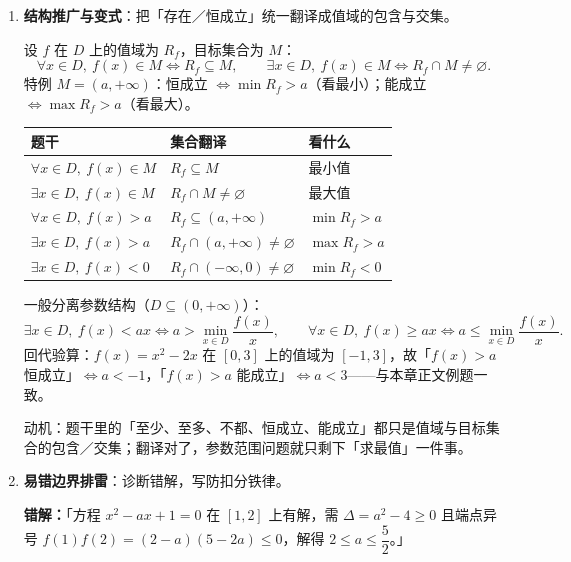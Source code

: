 \begin{tcolorbox}
\begin{enumerate}[label=(\arabic*), itemsep=4pt]
\textbf{对读结论}：通法胜在「步步可得分」，但要分三段；分离参数／补集胜在「一行出答案」。考场上先用高观点预判答案，再用通法把步骤写满。

\item \textbf{结构推广与变式}：把「存在／恒成立」统一翻译成值域的包含与交集。

\begin{advancedonly}
设 $f$ 在 $D$ 上的值域为 $R_f$，目标集合为 $M$：
\[
\forall x\in D,\ f(x)\in M\iff R_f\subseteq M,\qquad
\exists x\in D,\ f(x)\in M\iff R_f\cap M\neq\varnothing .
\]
特例 $M=(a,+\infty)$：恒成立 $\iff\min R_f>a$（看最小）；能成立 $\iff\max R_f>a$（看最大）。

\begin{center}\small
\begin{tabular}{p{3.6cm}p{5.4cm}p{3.2cm}}
\hline
题干 & 集合翻译 & 看什么 \\
\hline
$\forall x\in D,\ f(x)\in M$ & $R_f\subseteq M$ & 最小值 \\
$\exists x\in D,\ f(x)\in M$ & $R_f\cap M\neq\varnothing$ & 最大值 \\
$\forall x\in D,\ f(x)>a$ & $R_f\subseteq(a,+\infty)$ & $\min R_f>a$ \\
$\exists x\in D,\ f(x)>a$ & $R_f\cap(a,+\infty)\neq\varnothing$ & $\max R_f>a$ \\
$\exists x\in D,\ f(x)<0$ & $R_f\cap(-\infty,0)\neq\varnothing$ & $\min R_f<0$ \\
\hline
\end{tabular}
\end{center}

一般分离参数结构（$D\subseteq(0,+\infty)$）：
\[
\exists x\in D,\ f(x)<ax\iff a>\min_{x\in D}\frac{f(x)}x,\qquad
\forall x\in D,\ f(x)\ge ax\iff a\le\min_{x\in D}\frac{f(x)}x .
\]
回代验算：$f(x)=x^2-2x$ 在 $[0,3]$ 上的值域为 $[-1,3]$，故「$f(x)>a$ 恒成立」$\iff a<-1$，「$f(x)>a$ 能成立」$\iff a<3$——与本章正文例题一致。

动机：题干里的「至少、至多、不都、恒成立、能成立」都只是值域与目标集合的包含／交集；翻译对了，参数范围问题就只剩下「求最值」一件事。
\end{advancedonly}

\item \textbf{易错边界排雷}：诊断错解，写防扣分铁律。

{\bfseries\color{red!70!black}错解：}「方程 $x^2-ax+1=0$ 在 $[1,2]$ 上有解，需 $\Delta=a^2-4\ge0$ 且端点异号 $f(1)f(2)=(2-a)(5-2a)\le0$，解得 $2\le a\le\dfrac52$。」


\end{enumerate}
\end{tcolorbox}
